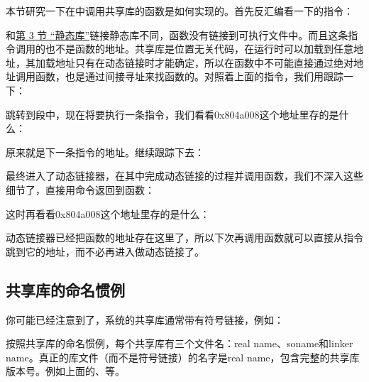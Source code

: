 本节研究一下在中调用共享库的函数是如何实现的。首先反汇编看一下的指令：




和\hyperlink{db.ch20s03.id2789183}{第 3 节 “静态库”}链接静态库不同，函数没有链接到可执行文件中。而且这条指令调用的也不是函数的地址。共享库是位置无关代码，在运行时可以加载到任意地址，其加载地址只有在动态链接时才能确定，所以在函数中不可能直接通过绝对地址调用函数，也是通过间接寻址来找函数的。对照着上面的指令，我们用跟踪一下：




跳转到段中，现在将要执行一条指令，我们看看0x804a008这个地址里存的是什么：




原来就是下一条指令的地址。继续跟踪下去：




最终进入了动态链接器，在其中完成动态链接的过程并调用函数，我们不深入这些细节了，直接用命令返回到函数：




这时再看看0x804a008这个地址里存的是什么：




动态链接器已经把函数的地址存在这里了，所以下次再调用函数就可以直接从指令跳到它的地址，而不必再进入做动态链接了。


\subsection{共享库的命名惯例}
%


你可能已经注意到了，系统的共享库通常带有符号链接，例如：




按照共享库的命名惯例，每个共享库有三个文件名：real name、soname和linker name。真正的库文件（而不是符号链接）的名字是real name，包含完整的共享库版本号。例如上面的、等。



